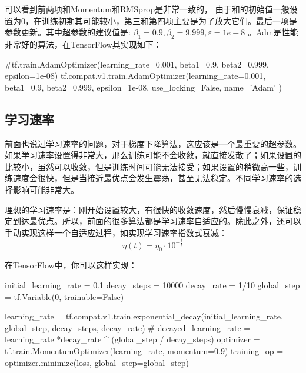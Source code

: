 \documentclass[12pt]{article}
\begin{document}
可以看到前两项和Momentum和RMSprop是非常一致的， 由于和的初始值一般设置为0，在训练初期其可能较小，第三和第四项主要是为了放大它们。最后一项是参数更新。其中超参数的建议值是: $\beta_1 = 0.9,  \beta_2 = 9.999, \varepsilon = 1e-8$ 。Adm是性能非常好的算法，在TensorFlow其实现如下：
\begin{python}
#tf.train.AdamOptimizer(learning_rate=0.001, beta1=0.9, beta2=0.999, epsilon=1e-08)
tf.compat.v1.train.AdamOptimizer(learning_rate=0.001, beta1=0.9, beta2=0.999, epsilon=1e-08, use_locking=False, name='Adam'
)
\end{python}

\subsection{学习速率}
前面也说过学习速率的问题，对于梯度下降算法，这应该是一个最重要的超参数。如果学习速率设置得非常大，那么训练可能不会收敛，就直接发散了；如果设置的比较小，虽然可以收敛，但是训练时间可能无法接受；如果设置的稍微高一些，训练速度会很快，但是当接近最优点会发生震荡，甚至无法稳定。不同学习速率的选择影响可能非常大。

理想的学习速率是：刚开始设置较大，有很快的收敛速度，然后慢慢衰减，保证稳定到达最优点。所以，前面的很多算法都是学习速率自适应的。除此之外，还可以手动实现这样一个自适应过程，如实现学习速率指数式衰减：
$$
\eta(t) = \eta_0 \cdot 10^{-\frac{t}{r}}
$$

在TensorFlow中，你可以这样实现：
\begin{python}
initial_learning_rate = 0.1
decay_steps = 10000
decay_rate = 1/10
global_step = tf.Variable(0, trainable=False)

learning_rate = tf.compat.v1.train.exponential_decay(initial_learning_rate, 
global_step, decay_steps,
decay_rate)
# decayed_learning_rate = learning_rate *decay_rate ^ (global_step / decay_steps)
optimizer = tf.train.MomentumOptimizer(learning_rate, momentum=0.9)
training_op = optimizer.minimize(loss, global_step=global_step)
\end{python}
\end{document}
